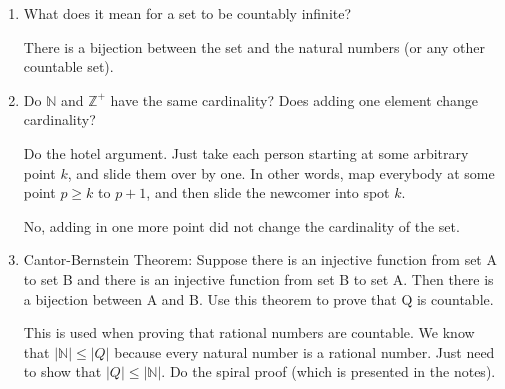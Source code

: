 \question 
\begin{enumerate}[label=(\alph*.)]
\item
What does it mean for a set to be countably infinite? 
\begin{solution}
There is a bijection between the set and the natural numbers (or any other countable set).
\end{solution}

\item
Do $\mathbb{N}$ and $\mathbb{Z}^+$ have the same cardinality? Does adding one element change cardinality?
\begin{solution}
Do the hotel argument. Just take each person starting at some arbitrary point $k$, and slide them over by one. In other words, map everybody at some point $p \ge k$ to $p + 1$, and then slide the newcomer into spot $k$.

No, adding in one more point did not change the cardinality of the set.
\end{solution}
\item
Cantor-Bernstein Theorem: Suppose there is an injective function from set A to set B and there is an injective function from set B to set A. Then there is a bijection between A and B.
Use this theorem to prove that Q is countable.
\begin{solution}
This is used when proving that rational numbers are countable. 
We know that $|\mathbb{N}| \le |Q|$ because every natural number is a rational number.
Just need to show that $|Q| \le |\mathbb{N}|$. Do the spiral proof (which is presented in the notes).
\end{solution}

\end{enumerate}